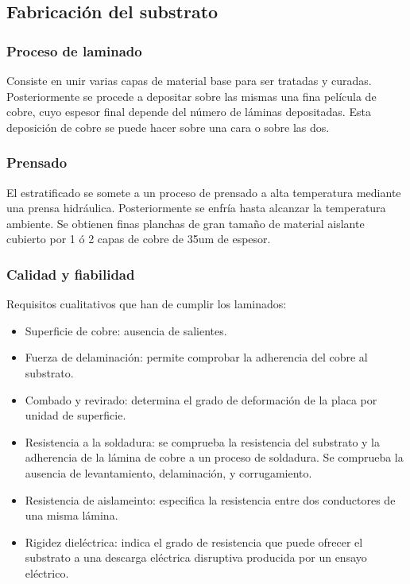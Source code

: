 \subsection{Fabricación del substrato}
\subsubsection{Proceso de laminado}
Consiste en unir varias capas de material base para ser tratadas y curadas. Posteriormente se procede a depositar sobre las mismas una fina película de cobre, cuyo espesor final depende del número de láminas depositadas. Esta deposición de cobre se puede hacer sobre una cara o sobre las dos.

\subsubsection{Prensado}
El estratificado se somete a un proceso de prensado a alta temperatura mediante una prensa hidráulica. Posteriormente se enfría hasta alcanzar la temperatura ambiente. Se obtienen finas planchas de gran tamaño de material aislante cubierto por 1 ó 2 capas de cobre de 35um de espesor.

\subsubsection{Calidad y fiabilidad}
Requisitos cualitativos que han de cumplir los laminados:
\begin{itemize}
    \item Superficie de cobre: ausencia de salientes.
    \item Fuerza de delaminación: permite comprobar la adherencia del cobre al substrato.
    \item Combado y revirado: determina el grado de deformación de la placa por unidad de superficie.
    \item Resistencia a la soldadura: se comprueba la resistencia del substrato y la adherencia de la lámina de cobre a un proceso de soldadura. Se comprueba la ausencia de levantamiento, delaminación, y corrugamiento.
    \item Resistencia de aislameinto: especifica la resistencia entre dos conductores de una misma lámina.
    \item Rigidez dieléctrica: indica el grado de resistencia que puede ofrecer el substrato a una descarga eléctrica disruptiva producida por un ensayo eléctrico.
\end{itemize}

